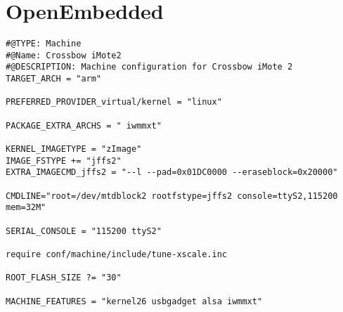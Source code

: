 \chapter{OpenEmbedded}
\label{annexoe}

\begin{verbatim}
#@TYPE: Machine
#@Name: Crossbow iMote2
#@DESCRIPTION: Machine configuration for Crossbow iMote 2
TARGET_ARCH = "arm"

PREFERRED_PROVIDER_virtual/kernel = "linux"

PACKAGE_EXTRA_ARCHS = " iwmmxt"

KERNEL_IMAGETYPE = "zImage"
IMAGE_FSTYPE += "jffs2"
EXTRA_IMAGECMD_jffs2 = "--l --pad=0x01DC0000 --eraseblock=0x20000"

CMDLINE="root=/dev/mtdblock2 rootfstype=jffs2 console=ttyS2,115200 mem=32M"

SERIAL_CONSOLE = "115200 ttyS2"

require conf/machine/include/tune-xscale.inc

ROOT_FLASH_SIZE ?= "30"

MACHINE_FEATURES = "kernel26 usbgadget alsa iwmmxt"
\end{verbatim}
